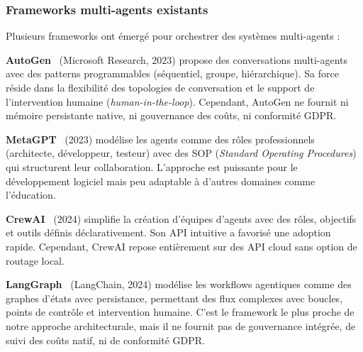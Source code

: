 \documentclass[12pt, a4paper]{article}
\newcommand{\acrshort}[1]{\MakeUppercase{#1}}
\begin{document}
\subsubsection{Frameworks multi-agents existants}

Plusieurs frameworks ont émergé pour orchestrer des systèmes multi-agents :

\textbf{AutoGen}~\cite{wu2023autogen} (Microsoft Research, 2023) propose des conversations multi-agents avec des patterns programmables (séquentiel, groupe, hiérarchique). Sa force réside dans la flexibilité des topologies de conversation et le support de l'intervention humaine (\textit{human-in-the-loop}). Cependant, AutoGen ne fournit ni mémoire persistante native, ni gouvernance des coûts, ni conformité GDPR.

\textbf{MetaGPT}~\cite{hong2023metagpt} (2023) modélise les agents comme des rôles professionnels (architecte, développeur, testeur) avec des SOP (\textit{Standard Operating Procedures}) qui structurent leur collaboration. L'approche est puissante pour le développement logiciel mais peu adaptable à d'autres domaines comme l'éducation.

\textbf{CrewAI}~\cite{crewai2024} (2024) simplifie la création d'équipes d'agents avec des rôles, objectifs et outils définis déclarativement. Son \acrshort{api} intuitive a favorisé une adoption rapide. Cependant, CrewAI repose entièrement sur des API cloud sans option de routage local.

\textbf{LangGraph}~\cite{langgraph2024} (LangChain, 2024) modélise les workflows agentiques comme des graphes d'états avec persistance, permettant des flux complexes avec boucles, points de contrôle et intervention humaine. C'est le framework le plus proche de notre approche architecturale, mais il ne fournit pas de gouvernance intégrée, de suivi des coûts natif, ni de conformité GDPR.
\end{document}
